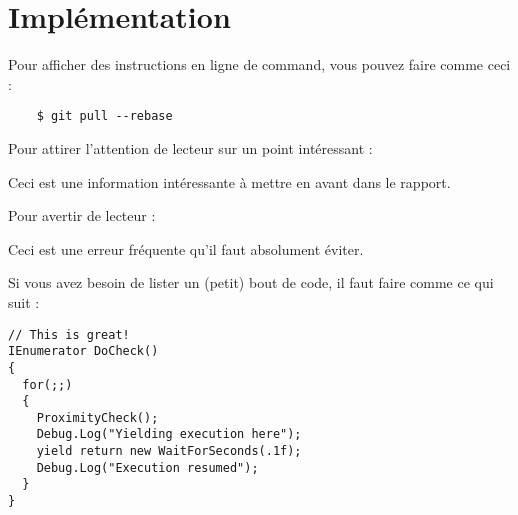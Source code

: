 \chapter{Implémentation}
Pour afficher des instructions en ligne de command, vous pouvez faire comme ceci :
\begin{commandline}
  \begin{verbatim}
	$ git pull --rebase
	\end{verbatim}
\end{commandline}

Pour attirer l'attention de lecteur sur un point intéressant :
\begin{info}
 	Ceci est une information intéressante à mettre en avant dans le rapport.
\end{info}

Pour avertir de lecteur :
\begin{warn}
 	Ceci est une erreur fréquente qu'il faut absolument éviter.
\end{warn}

Si vous avez besoin de lister un (petit) bout de code, il faut faire comme ce qui suit :
\begin{lstlisting}
// This is great!
IEnumerator DoCheck() 
{
  for(;;)
  {
    ProximityCheck();
    Debug.Log("Yielding execution here");
    yield return new WaitForSeconds(.1f);
    Debug.Log("Execution resumed");
  }
}
\end{lstlisting}
